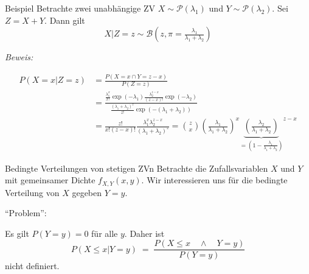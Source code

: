 \documentclass[
  10pt,
  ignorenonframetext,
]{beamer}
\begin{document}
\begin{frame}{Beispiel}
\label{beispiel-3}
Betrachte zwei unabhängige ZV \(X\sim\mathcal P(\lambda_1)\) und
\(Y \sim \mathcal P(\lambda_2)\). Sei \(Z=X+Y\). Dann gilt \[
X|Z = z \sim {\mathcal B}\left(z, \pi=\tfrac{\lambda_1}{\lambda_1+\lambda_2}\right) 
\]

\emph{Beweis:}

\begin{align*}
P(X=x|Z=z) &= \frac{P(X=x \cap Y = z-x)}{P(Z=z)} \\
&= \frac{ \frac{\lambda_1^x}{x!}\exp(-\lambda_1)  \frac{\lambda_2^{z-x}}{(z-x)!}\exp(-\lambda_2)}{  \frac{(\lambda_1+\lambda_2)^z}{z!}\exp(-(\lambda_1+\lambda_2)) } \\
&= \frac{z!}{x!(z-x)!}  \frac{\lambda_1^x \lambda_2^{z-x}}{(\lambda_1 + \lambda_2)^{z}} = \binom{z}{x} \left(\frac{\lambda_1}{\lambda_1+\lambda_2}\right)^x
{\underbrace{\left(\frac{\lambda_2}{\lambda_1+\lambda_2}\right)}_{= \left(1-\tfrac{\lambda_1}{\lambda_1+\lambda_2}\right)}}^{z-x}
\end{align*}
\end{frame}

\begin{frame}{Bedingte Verteilungen von stetigen ZVn}
\label{bedingte-verteilungen-von-stetigen-zvn}
Betrachte die Zufallsvariablen \(X\) und \(Y\) mit gemeinsamer Dichte
\(f_{X,Y}(x,y)\). Wir interessieren uns für die bedingte Verteilung von
\(X\) gegeben \(Y = y\).

``Problem'':

Es gilt \(P(Y = y) = 0\) für alle \(y\). Daher ist \[
P(X \leq x | Y = y) \; = \; \frac{P(X \leq x \quad \land
\quad Y = y)}{P(Y = y)}
\] nicht definiert.
\end{frame}
\end{document}
